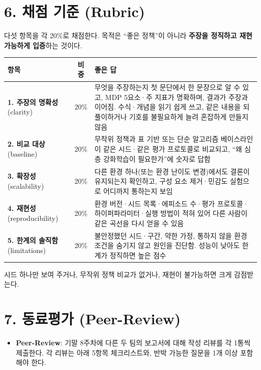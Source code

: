 \documentclass[12pt]{article}
\begin{document}
\section*{6. 채점 기준 (Rubric)}
다섯 항목을 각 20\%로 채점한다. 목적은 ``좋은 정책''이 아니라 \textbf{주장을 정직하고 재현 가능하게 입증}하는 것이다.
\begin{center}
\small
\begin{tabular}{@{}p{3.3cm}cp{7.4cm}@{}}
\toprule
항목 & 비중 & 좋은 답 \\
\midrule
\textbf{1. 주장의 명확성} (clarity) & 20\% & 무엇을 주장하는지 첫 문단에서 한 문장으로 알 수 있고, MDP 5요소·주 지표가 명확하며, 결과가 주장과 이어짐. 수식·개념을 읽기 쉽게 쓰고, 같은 내용을 되풀이하거나 기호를 불필요하게 늘려 혼잡하게 만들지 않음 \\
\textbf{2. 비교 대상} (baseline) & 20\% & 무작위 정책과 표 기반 또는 단순 알고리즘 베이스라인이 같은 시드·같은 평가 프로토콜로 비교되고, ``왜 심층 강화학습이 필요한가''에 숫자로 답함 \\
\textbf{3. 확장성} (scalability) & 20\% & 다른 환경 하나(또는 환경 난이도 변경)에서도 결론이 유지되는지 확인하고, 구성 요소 제거·민감도 실험으로 어디까지 통하는지 보임 \\
\textbf{4. 재현성} (reproducibility) & 20\% & 환경 버전·시드 목록·에피소드 수·평가 프로토콜·하이퍼파라미터·실행 방법이 적혀 있어 다른 사람이 같은 곡선을 다시 얻을 수 있음 \\
\textbf{5. 한계의 솔직함} (limitations) & 20\% & 불안정했던 시드·구간, 약한 가정, 통하지 않을 환경 조건을 숨기지 않고 원인을 진단함. 성능이 낮아도 한계가 정직하면 높은 점수 \\
\bottomrule
\end{tabular}
\end{center}
\vspace{4pt}
시드 하나만 보여 주거나, 무작위 정책 비교가 없거나, 재현이 불가능하면 크게 감점받는다.

\newpage
\section*{7. 동료평가 (Peer-Review)}
\begin{itemize}
\item \textbf{Peer-Review}: 기말 8주차에 다른 두 팀의 보고서에 대해 작성 리뷰를 각 1통씩 제출한다. 각 리뷰는 아래 5항목 체크리스트와, 반박 가능한 질문을 1개 이상 포함해야 한다.
\end{itemize}
\end{document}
